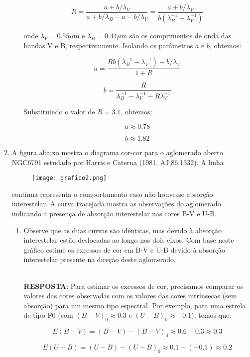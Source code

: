 \documentclass[a4paper,12pt]{article}
\begin{document}
\begin{enumerate}
\begin{enumerate}
$$R = \frac{a + b/\lambda_V}{a + b/\lambda_B - a - b/\lambda_V} = \frac{a + b/\lambda_V}{b(\lambda_B^{-1} - \lambda_V^{-1})}$$

onde $\lambda_V = 0.55 \mu$m e $\lambda_B = 0.44 \mu$m são os comprimentos de onda das bandas V e B, respectivamente. Isolando os parâmetros $a$ e $b$, obtemos:

$$a = \frac{Rb(\lambda_B^{-1} - \lambda_V^{-1}) - b/\lambda_V}{1 + R}$$

$$b = \frac{R}{\lambda_B^{-1} - \lambda_V^{-1} - R\lambda_V^{-1}}$$

Substituindo o valor de $R=3.1$, obtemos:

$$a \approx 0.78$$

$$b \approx 1.82$$

\end{enumerate}

\noindent\hrulefill

\item A figura abaixo mostra o diagrama cor-cor para o aglomerado aberto NGC6791 estudado por Harris e Caterna (1981, AJ,86,1332). A linha 

\begin{figure}[!htb]
    \centering
    \texttt{[image: grafico2.png]}
\end{figure}

contínua representa o comportamento caso não houvesse absorção interestelar. A curva tracejada mostra as observações do aglomerado indicando a presença de absorção interestelar nas cores B-V e U-B.

\begin{enumerate}
\item Observe que as duas curvas são idênticas, mas devido à absorção interestelar estão deslocadas ao longo nos dois eixos. Com base neste gráfico estime os excessos de cor em B-V e U-B devido à absorção interestelar presente na direção deste aglomerado.

\noindent\hrulefill\\\textbf{RESPOSTA}: Para estimar os excessos de cor, precisamos comparar os valores das cores observadas com os valores das cores intrínsecas (sem absorção) para um mesmo tipo espectral. Por exemplo, para uma estrela de tipo F0 (com $(B-V)_0 \approx 0.3$ e $(U-B)_0 \approx -0.1$), temos que:

$$E(B-V) = (B-V) - (B-V)_0 \approx 0.6 - 0.3 \approx 0.3$$

$$E(U-B) = (U-B) - (U-B)_0 \approx 0.1 - (-0.1) \approx 0.2$$


\end{enumerate}
\end{enumerate}
\end{document}
